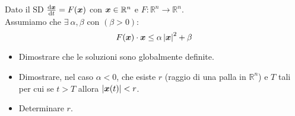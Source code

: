 \noindent
\begin{ex}
    Dato il SD $\frac{\text{d} \boldsymbol{x}}{\text{d} t} = F(\boldsymbol{x})$ con $\boldsymbol{x}\in \mathbb{R}^n$ e $F: \mathbb{R}^n\to \mathbb{R}^n$.\\
    Assumiamo che $\exists \ \alpha, \beta$ con $(\beta >0)$:
    \[
	F(\boldsymbol{x})\cdot \boldsymbol{x}\le \alpha\left|\boldsymbol{x}\right|^2+ \beta
    \] 	
    \begin{itemize}
        \item Dimostrare che le soluzioni sono globalmente definite.
	\item Dimostrare, nel caso $\alpha <0$, che esiste $r$ (raggio di una palla in $\mathbb{R}^n$) e $T$ tali per cui se $t>T$ allora $\left|\boldsymbol{x} (t)\right|<r$.
	\item Determinare $r$.
    \end{itemize}

\end{ex}
\noindent
